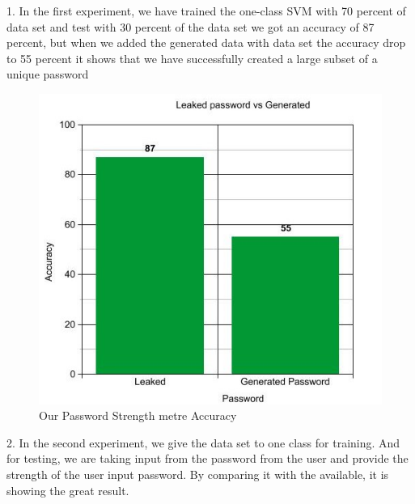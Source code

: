 \documentclass[runningheads]{llncs}
\begin{document}
 1. In the first experiment, we have trained the one-class SVM with 70 percent of data set and test with 30 percent of the data set we got an accuracy of 87 percent, but when we added the generated data with data set the accuracy drop to 55 percent it shows that we have successfully created a large subset of a unique password
\par
\begin{figure}
  \centering
\begin{minipage}[b]{0.8\textwidth}
  \begin{mdframed}
    \includegraphics[width=\textwidth]{graph.jpg}
    \end{mdframed}
    \caption{Our Password Strength metre Accuracy}
  \end{minipage}
\end{figure}
\hfill
\par
2. In the second experiment, we give the data set to one class for training. And for testing, we are taking input from the password from the user and provide the strength of the user input password. By comparing it with the available, it is showing the great result.
\end{document}
